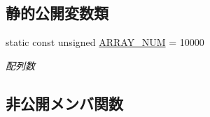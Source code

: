 \subsection*{静的公開変数類}
\begin{DoxyCompactItemize}
\item 
static const unsigned \mbox{\hyperlink{class_collision_manager_addbc64e1fa0b01f3be07c897887f44ec}{A\+R\+R\+A\+Y\+\_\+\+N\+UM}} = 10000
\begin{DoxyCompactList}\small\item\em 配列数 \end{DoxyCompactList}\end{DoxyCompactItemize}
\subsection*{非公開メンバ関数}
